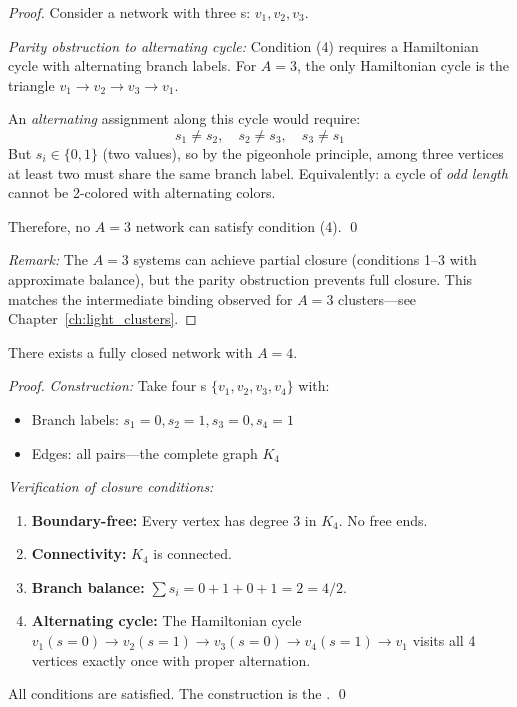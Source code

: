 \begin{proof}
    Consider a network with three \Junction{}s: $v_1, v_2, v_3$.

    \emph{Parity obstruction to alternating cycle:} Condition (4) requires a
    Hamiltonian cycle with alternating branch labels. For $A = 3$, the only
    Hamiltonian cycle is the triangle $v_1 \to v_2 \to v_3 \to v_1$.

    An \emph{alternating} assignment along this cycle would require:
    \[
        s_1 \neq s_2, \quad s_2 \neq s_3, \quad s_3 \neq s_1
    \]
    But $s_i \in \{0, 1\}$ (two values), so by the pigeonhole principle,
    among three vertices at least two must share the same branch label.
    Equivalently: a cycle of \emph{odd length} cannot be 2-colored with
    alternating colors.

    Therefore, no $A = 3$ network can satisfy condition (4). \qed

    \emph{Remark:} The $A = 3$ systems can achieve partial closure (conditions
    1--3 with approximate balance), but the parity obstruction prevents full
    closure. This matches the intermediate binding observed for $A = 3$
    clusters---see Chapter~\ref{ch:light_clusters}.
\end{proof}

\begin{lemma} \tagDer
    \label{lem:closed-4-exists}
    There exists a fully closed network with $A = 4$.
\end{lemma}

\begin{proof}
    \emph{Construction:} Take four \Junction{}s $\{v_1, v_2, v_3, v_4\}$ with:
    \begin{itemize}
        \item Branch labels: $s_1 = 0, s_2 = 1, s_3 = 0, s_4 = 1$
        \item Edges: all pairs---the complete graph $K_4$
    \end{itemize}

    \emph{Verification of closure conditions:}
    \begin{enumerate}
        \item \textbf{Boundary-free:} Every vertex has degree 3 in $K_4$.
              No free ends. \checkmark
        \item \textbf{Connectivity:} $K_4$ is connected. \checkmark
        \item \textbf{Branch balance:} $\sum s_i = 0 + 1 + 0 + 1 = 2 = 4/2$. \checkmark
        \item \textbf{Alternating cycle:} The Hamiltonian cycle
              $v_1 (s=0) \to v_2 (s=1) \to v_3 (s=0) \to v_4 (s=1) \to v_1$
              visits all 4 vertices exactly once with proper alternation. \checkmark
    \end{enumerate}

    All conditions are satisfied. The construction is the \ClosedFour{}. \qed
\end{proof}

